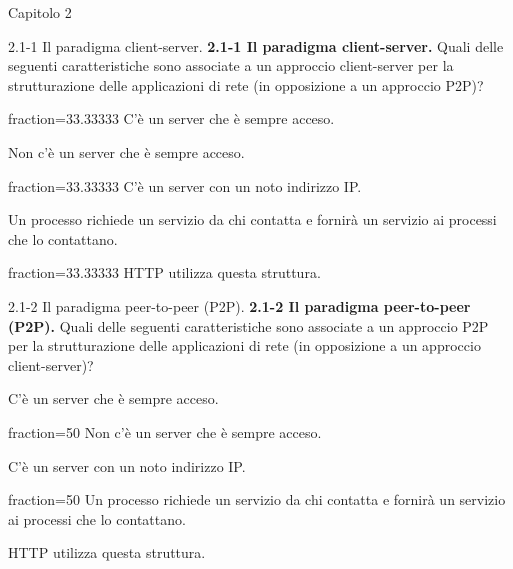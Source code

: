 \documentclass[a4paper]{article}
\begin{document}
\begin{quiz}{Capitolo 2}

\begin{multi}[points=1,shuffle,multiple,]{2.1-1 Il paradigma client-server.}
\textbf{2.1-1 Il paradigma client-server.} Quali delle seguenti caratteristiche sono associate a un approccio client-server per la strutturazione delle applicazioni di rete (in opposizione a un approccio P2P)?
\item[fraction=33.33333] C'è un server che è sempre acceso.
\item Non c'è un server che è sempre acceso.
\item[fraction=33.33333] C'è un server con un noto indirizzo IP.
\item Un processo richiede un servizio da chi contatta e fornirà un servizio ai processi che lo contattano.
\item[fraction=33.33333] HTTP utilizza questa struttura.
\end{multi}

\begin{multi}[points=1,shuffle,multiple]{2.1-2 Il paradigma peer-to-peer (P2P).}
\textbf{2.1-2 Il paradigma peer-to-peer (P2P).} Quali delle seguenti caratteristiche sono associate a un approccio P2P per la strutturazione delle applicazioni di rete (in opposizione a un approccio client-server)?
\item C'è un server che è sempre acceso.
\item[fraction=50] Non c'è un server che è sempre acceso.
\item C'è un server con un noto indirizzo IP.
\item[fraction=50] Un processo richiede un servizio da chi contatta e fornirà un servizio ai processi che lo contattano.
\item HTTP utilizza questa struttura.
\end{multi}


\end{quiz}
\end{document}
